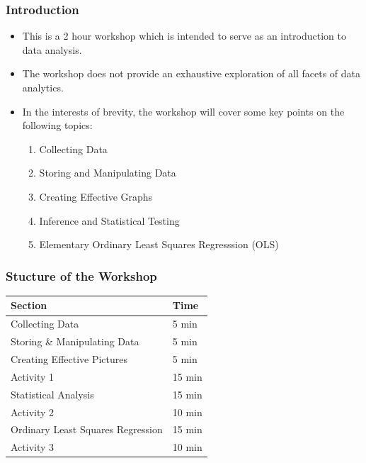 \documentclass{beamer}
\begin{document}
\begin{frame}
\frametitle{Introduction}
\begin{itemize}
\item This is a 2 hour workshop which is intended to serve as an introduction to data analysis.
\vspace{0.3cm}
\item The workshop does not provide an exhaustive exploration of all facets of data analytics.\\
\vspace{0.3cm}
\item In the interests of brevity, the workshop will cover some key points on the following topics:\\
\vspace{0.2cm}
\begin{enumerate}
\item Collecting Data
\vspace{0.2cm}
\item Storing and Manipulating Data
\vspace{0.2cm}
\item Creating Effective Graphs
\vspace{0.2cm}
\item Inference and Statistical Testing
\vspace{0.2cm}
\item Elementary Ordinary Least Squares Regresssion (OLS)
\end{enumerate}
\end{itemize}
\end{frame}


\begin{frame}
\frametitle{Stucture of the Workshop}
\begin{table}
\begin{tabular}{l l}
\toprule
\textbf{Section} & \textbf{Time}\\
\midrule
Collecting Data & 5 min\\
Storing \& Manipulating Data & 5 min\\
Creating Effective Pictures & 5 min\\
Activity 1 & 15 min\\
Statistical Analysis & 15 min\\
Activity 2 & 10 min\\
Ordinary Least Squares Regression & 15 min\\
Activity 3 & 10 min\\
\bottomrule
\end{tabular}
\end{table}
\end{frame}
\end{document}
